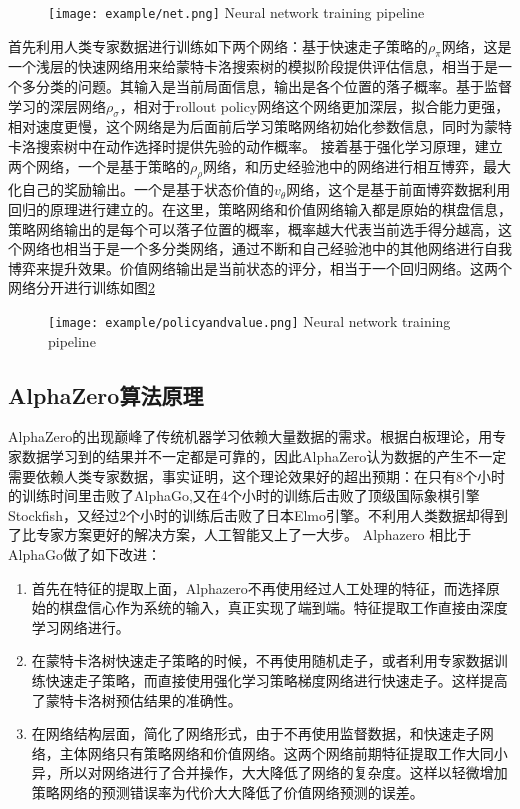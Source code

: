 \begin{figure}[!htp]
	\centering
	\texttt{[image: example/net.png]}
	{Neural network training pipeline}
	\label{fig:net}
\end{figure}
首先利用人类专家数据进行训练如下两个网络：基于快速走子策略的${\rho _\pi }$网络，这是一个浅层的快速网络用来给蒙特卡洛搜索树的模拟阶段提供评估信息，相当于是一个多分类的问题。其输入是当前局面信息，输出是各个位置的落子概率。基于监督学习的深层网络${\rho _\sigma }$，相对于rollout policy网络这个网络更加深层，拟合能力更强，相对速度更慢，这个网络是为后面前后学习策略网络初始化参数信息，同时为蒙特卡洛搜索树中在动作选择时提供先验的动作概率。
接着基于强化学习原理，建立两个网络，一个是基于策略的${\rho _\rho }$网络，和历史经验池中的网络进行相互博弈，最大化自己的奖励输出。一个是基于状态价值的${v_\theta }$网络，这个是基于前面博弈数据利用回归的原理进行建立的。在这里，策略网络和价值网络输入都是原始的棋盘信息，策略网络输出的是每个可以落子位置的概率，概率越大代表当前选手得分越高，这个网络也相当于是一个多分类网络，通过不断和自己经验池中的其他网络进行自我博弈来提升效果。价值网络输出是当前状态的评分，相当于一个回归网络。这两个网络分开进行训练如图\ref{fig:policyandvalue}
\begin{figure}[!htp]
	\centering
	\texttt{[image: example/policyandvalue.png]}
	{Neural network training pipeline}
	\label{fig:policyandvalue}
\end{figure}
\subsection{AlphaZero算法原理}
AlphaZero的出现巅峰了传统机器学习依赖大量数据的需求。根据白板理论，用专家数据学习到的结果并不一定都是可靠的，因此AlphaZero认为数据的产生不一定需要依赖人类专家数据，事实证明，这个理论效果好的超出预期：在只有8个小时的训练时间里击败了AlphaGo,又在4个小时的训练后击败了顶级国际象棋引擎Stockfish，又经过2个小时的训练后击败了日本Elmo引擎。不利用人类数据却得到了比专家方案更好的解决方案，人工智能又上了一大步。
Alphazero 相比于AlphaGo做了如下改进：
\begin{enumerate}
	\item 首先在特征的提取上面，Alphazero不再使用经过人工处理的特征，而选择原始的棋盘信心作为系统的输入，真正实现了端到端。特征提取工作直接由深度学习网络进行。
	\item 在蒙特卡洛树快速走子策略的时候，不再使用随机走子，或者利用专家数据训练快速走子策略，而直接使用强化学习策略梯度网络进行快速走子。这样提高了蒙特卡洛树预估结果的准确性。
	\item 在网络结构层面，简化了网络形式，由于不再使用监督数据，和快速走子网络，主体网络只有策略网络和价值网络。这两个网络前期特征提取工作大同小异，所以对网络进行了合并操作，大大降低了网络的复杂度。这样以轻微增加策略网络的预测错误率为代价大大降低了价值网络预测的误差。
\end{enumerate}

